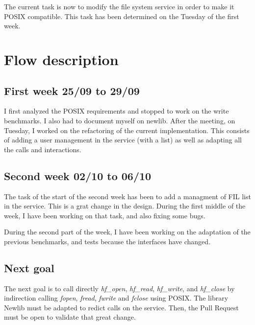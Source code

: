 \documentclass[12pt]{article}
\begin{document}
The current task is now to modify the file system service in order to 
make it POSIX compatible. This task has been determined on the Tuesday of the 
first week.

\section{Flow description}
\subsection{First week 25/09 to 29/09}
I first analyzed the POSIX requirements and stopped to work on the write 
benchmarks. I also had to document myself on newlib. 
After the meeting, on Tuesday, I worked on the refactoring of the 
current implementation. 
This consists of adding a user management in the service (with a list) 
as well as adapting all the calls and interactions.


\subsection{Second week 02/10 to 06/10}
The task of the start of the second week has been to add a managment of 
FIL list in the service. This is a grat change in the design.
During the first middle of the week, I have been working on that task, and 
also fixing some bugs.

During the second part of the week, I have been working on the adaptation 
of the previous benchmarks, and tests because the interfaces have changed.

\subsection{Next goal}
The next goal is to call directly \textit{hf\_open}, \textit{hf\_read},
\textit{hf\_write}, and \textit{hf\_close} by indirection calling 
\textit{fopen}, \textit{fread}, \textit{fwrite} and \textit{fclose} using 
POSIX. The library Newlib must be adapted to redict calls on the service.
Then, the Pull Request must be open to validate that great change.
\end{document}
